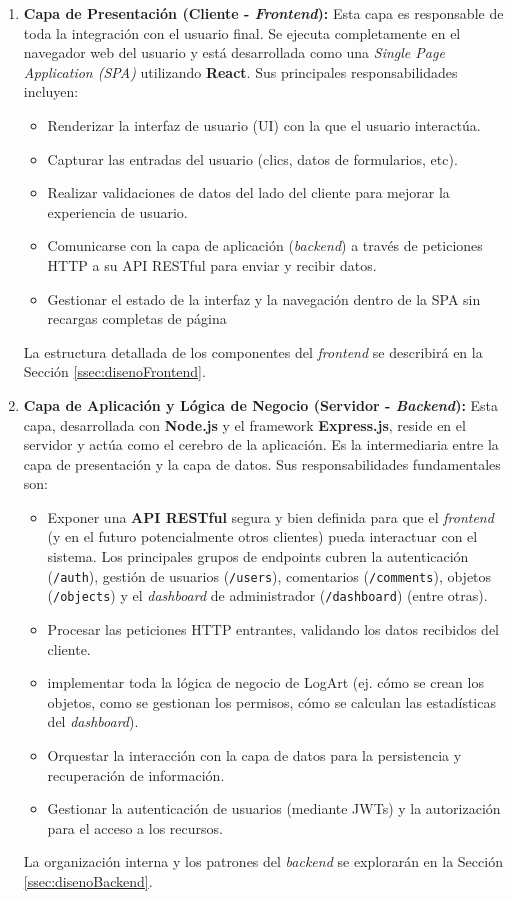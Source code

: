 \begin{enumerate}
    \item \textbf{Capa de Presentación (Cliente - \textit{Frontend}):}
    Esta capa es responsable de toda la integración con el usuario final. Se ejecuta completamente en el navegador web del usuario y está desarrollada como una \textit{Single Page Application (SPA)} utilizando \textbf{React}. Sus principales responsabilidades incluyen:
    \begin{itemize}
        \item Renderizar la interfaz de usuario (UI) con la que el usuario interactúa.
        \item Capturar las entradas del usuario (clics, datos de formularios, etc).
        \item Realizar validaciones de datos del lado del cliente para mejorar la experiencia de usuario.
        \item Comunicarse con la capa de aplicación (\textit{backend}) a través de peticiones HTTP a su API RESTful para enviar y recibir datos.
        \item Gestionar el estado de la interfaz y la navegación dentro de la SPA sin recargas completas de página
    \end{itemize}
    La estructura detallada de los componentes del \textit{frontend} se describirá en la Sección \ref{ssec:disenoFrontend}.

    \item \textbf{Capa de Aplicación y Lógica de Negocio (Servidor - \textit{Backend}):}
    Esta capa, desarrollada con \textbf{Node.js} y el framework \textbf{Express.js}, reside en el servidor y actúa como el cerebro de la aplicación. Es la intermediaria entre la capa de presentación y la capa de datos. Sus responsabilidades fundamentales son:
    \begin{itemize}
        \item Exponer una \textbf{API RESTful} segura y bien definida para que el \textit{frontend} (y en el futuro potencialmente otros clientes) pueda interactuar con el sistema. Los principales grupos de endpoints cubren la autenticación (\texttt{/auth}), gestión de usuarios (\texttt{/users}), comentarios (\texttt{/comments}), objetos (\texttt{/objects}) y el \textit{dashboard} de administrador (\texttt{/dashboard}) (entre otras).
        \item Procesar las peticiones HTTP entrantes, validando los datos recibidos del cliente.
        \item implementar toda la lógica de negocio de LogArt (ej. cómo se crean los objetos, como se gestionan los permisos, cómo se calculan las estadísticas del \textit{dashboard}).
        \item Orquestar la interacción con la capa de datos para la persistencia y recuperación de información.
        \item Gestionar la autenticación de usuarios (mediante JWTs) y la autorización para el acceso a los recursos.
    \end{itemize}
    La organización interna y los patrones del \textit{backend} se explorarán en la Sección \ref{ssec:disenoBackend}.


\end{enumerate}

